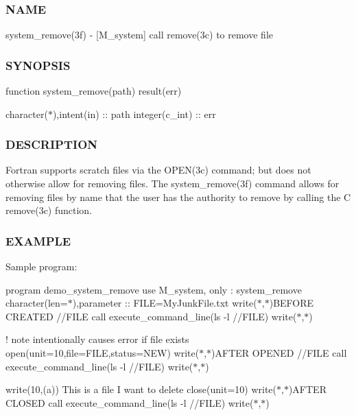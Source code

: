 \subsubsection*{N\+A\+ME}

system\+\_\+remove(3f) -\/ \mbox{[}M\+\_\+system\mbox{]} call remove(3c) to remove file \subsubsection*{S\+Y\+N\+O\+P\+S\+IS}

function system\+\_\+remove(path) result(err)

character($\ast$),intent(in) \+:\+: path integer(c\+\_\+int) \+:\+: err

\subsubsection*{D\+E\+S\+C\+R\+I\+P\+T\+I\+ON}

Fortran supports scratch files via the O\+P\+E\+N(3c) command; but does not otherwise allow for removing files. The system\+\_\+remove(3f) command allows for removing files by name that the user has the authority to remove by calling the C remove(3c) function.

\subsubsection*{E\+X\+A\+M\+P\+LE}

Sample program\+:

program demo\+\_\+system\+\_\+remove use M\+\_\+system, only \+: system\+\_\+remove character(len=$\ast$),parameter \+:\+: F\+I\+LE=\textquotesingle{}My\+Junk\+File.\+txt\textquotesingle{} write($\ast$,$\ast$)\textquotesingle{}B\+E\+F\+O\+RE C\+R\+E\+A\+T\+ED \textquotesingle{}//\+F\+I\+LE call execute\+\_\+command\+\_\+line(\textquotesingle{}ls -\/l \textquotesingle{}//\+F\+I\+LE) write($\ast$,$\ast$)

! note intentionally causes error if file exists open(unit=10,file=F\+I\+LE,status=\textquotesingle{}N\+EW\textquotesingle{}) write($\ast$,$\ast$)\textquotesingle{}A\+F\+T\+ER O\+P\+E\+N\+ED \textquotesingle{}//\+F\+I\+LE call execute\+\_\+command\+\_\+line(\textquotesingle{}ls -\/l \textquotesingle{}//\+F\+I\+LE) write($\ast$,$\ast$)

write(10,\textquotesingle{}(a)\textquotesingle{}) \textquotesingle{}This is a file I want to delete\textquotesingle{} close(unit=10) write($\ast$,$\ast$)\textquotesingle{}A\+F\+T\+ER C\+L\+O\+S\+ED \textquotesingle{} call execute\+\_\+command\+\_\+line(\textquotesingle{}ls -\/l \textquotesingle{}//\+F\+I\+LE) write($\ast$,$\ast$)

